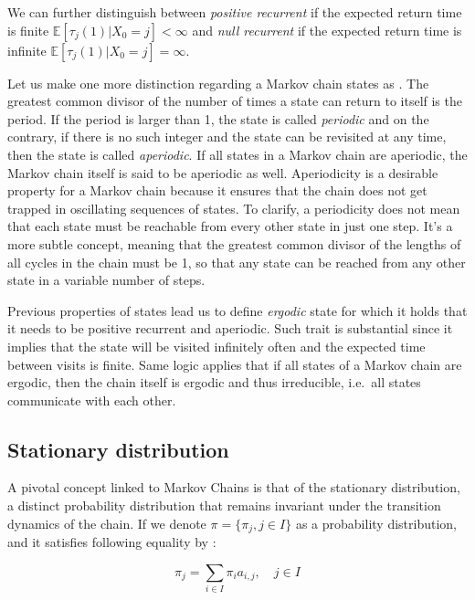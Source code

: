 We can further distinguish between \textit{positive recurrent} if the expected return time is finite $\mathbb{E}[\tau_j(1)|X_0=j] < \infty$ and \textit{null recurrent} if the expected return time is infinite $\mathbb{E}[\tau_j(1)|X_0=j] = \infty$.

Let us make one more distinction regarding a Markov chain states as \citep{Gebali2008}. The greatest common divisor of the number of times a state can return to itself is the period. If the period is larger than 1, the state is called \textit{periodic} and 
on the contrary, if there is no such integer and the state can be revisited at any time, then the state is called \textit{aperiodic}.
If all states in a Markov chain are aperiodic, the Markov chain itself is said to be aperiodic as well. Aperiodicity is a desirable property for a Markov chain because it ensures that the chain does not get trapped in oscillating sequences of states. 
To clarify, a periodicity does not mean that each state must be reachable from every other state in just one step. It's a more subtle concept, meaning that the greatest common divisor of the lengths of all cycles in the chain must be 1, so that any state can be reached from any other state in a variable number of steps.

Previous properties of states lead us to define \textit{ergodic} state for which it holds that it needs to be positive recurrent and aperiodic. Such trait is substantial since it implies that the state will be visited infinitely often and the expected time between visits is finite.
Same logic applies that if all states of a Markov chain are ergodic, then the chain itself is ergodic and thus irreducible, i.e.\ all states communicate with each other.

\subsection{Stationary distribution}

A pivotal concept linked to Markov Chains is that of the stationary distribution, a distinct probability 
distribution that remains invariant under the transition dynamics of the chain. 
If we denote $\pi = \{\pi_j,j \in I\}$ as a probability distribution, and it satisfies following equality by \citep{Bremaud1999}:

\begin{equation} \label{eq:stationary}
    \pi_j = \sum_{i \in I} \pi_i a_{i,j}, \quad j \in I
\end{equation}

